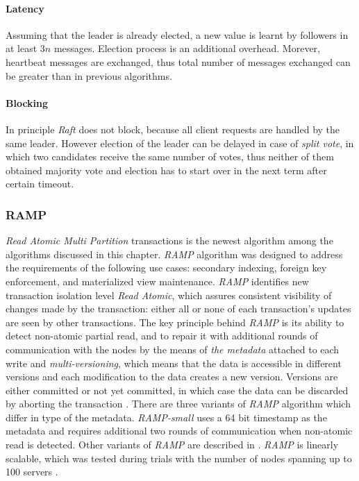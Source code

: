 \paragraph{Latency} Assuming that the leader is already elected, a new value is learnt by followers in at least $3n$ messages. Election process is an additional overhead. Morever, heartbeat messages are exchanged, thus total number of messages exchanged can be greater than in previous algorithms.

\paragraph{Blocking} In principle \emph{Raft} does not block, because all client requests are handled by the same leader. However election of the leader can be delayed in case of \emph{split vote}, in which two candidates receive the same number of votes, thus neither of them obtained majority vote and election has to start over in the next term after certain timeout.


\subsubsection{RAMP}\label{sec:theory:transactions:ramp}
\emph{Read Atomic Multi Partition} transactions \cite{Bailis:2014} is the newest algorithm among the algorithms discussed in this chapter. 
\emph{RAMP} algorithm was designed to address the requirements of the following use cases: secondary indexing, foreign key
enforcement, and materialized view maintenance.
\emph{RAMP} identifies new transaction isolation level \emph{Read Atomic}, which 
assures consistent visibility of changes made by the transaction: either all or none of each transaction's updates are seen by other transactions.
The key principle behind \emph{RAMP} is its ability to detect non-atomic partial read, and to repair it with additional rounds of communication with the nodes by the means of \emph{the metadata} attached to each write and \emph{multi-versioning}, which means that the data is accessible in different versions and each modification to the data creates a new version. Versions are either committed or not yet committed, in which case the data can be discarded by aborting the transaction \cite[p. 6]{Bailis:2014}. 
There are three variants of \emph{RAMP} algorithm which differ in type of the metadata. \emph{RAMP-small} uses a 64 bit timestamp as the metadata and requires additional two rounds of communication when non-atomic read is detected. Other variants of \emph{RAMP} are described in \cite[p. 5]{Bailis:2014}.
\emph{RAMP} is linearly scalable, which was tested during trials with the number of nodes spanning up to 100 servers \cite[p. 10]{Bailis:2014}.

